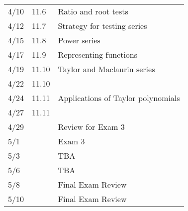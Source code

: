 \begin{center}
\begin{longtable}{lll}
    4/10 & 11.6 & Ratio and root tests\\ 
    4/12 & 11.7 & Strategy for testing series\\
    4/15 & 11.8 & Power series\\
    4/17 & 11.9 & Representing functions\\
    4/19 & 11.10 & Taylor and Maclaurin series\\
    4/22 & 11.10\\
    4/24 & 11.11 & Applications of Taylor polynomials\\
    4/27 & 11.11 \\
    4/29 & & Review for Exam 3\\
    5/1  & & Exam 3\\
    \hline
    5/3 & & TBA\\
    5/6 & & TBA\\
    5/8 & & Final Exam Review\\
    5/10 & & Final Exam Review\\
  \end{longtable}
\end{center}
